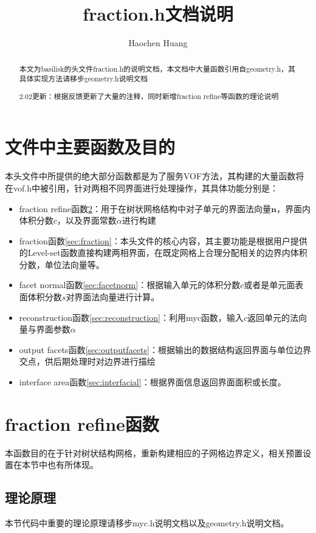 \documentclass[lang=cn,11pt,a4paper]{elegantpaper}
\title{fraction.h文档说明}
\author{Haochen Huang}
\institute{西安交通大学MFM课题组}
\date{\zhtoday}
\begin{document}
\maketitle
\tableofcontents

\begin{abstract}
本文为basilisk的头文件fraction.h的说明文档，本文档中大量函数引用自geometry.h，其具体实现方法请移步geometry.h说明文档\par
2.02更新：根据反馈更新了大量的注释，同时新增fraction refine等函数的理论说明
\end{abstract}


\section{文件中主要函数及目的}
本头文件中所提供的绝大部分函数都是为了服务VOF方法，其构建的大量函数将在vof.h中被引用，针对两相不同界面进行处理操作，其具体功能分别是：
\begin{itemize}
    \item fraction refine函数\ref{sec:fracrefine}：用于在树状网格结构中对子单元的界面法向量$\mathbf{n}$，界面内体积分数$c$，以及界面常数$\alpha$进行构建
    \item fraction函数\ref{sec:fraction}：本头文件的核心内容，其主要功能是根据用户提供的Level-set函数直接构建两相界面，在既定网格上合理分配相关的边界内体积分数，单位法向量等。
    \item facet normal函数\ref{sec:facetnorm}：根据输入单元的体积分数$c$或者是单元面表面体积分数$s$对界面法向量进行计算。
    \item reconstruction函数\ref{sec:reconstruction}：利用myc函数，输入$c$返回单元的法向量与界面参数$\alpha$
    \item output facets函数\ref{sec:outputfacets}：根据输出的数据结构返回界面与单位边界交点，供后期处理时对边界进行描绘
    \item interface area函数\ref{sec:interfacial}：根据界面信息返回界面面积或长度。
\end{itemize}
\section{fraction refine函数}\label{sec:fracrefine}
本函数目的在于针对树状结构网格，重新构建相应的子网格边界定义，相关预置设置在本节中也有所体现。
\subsection{理论原理}
本节代码中重要的理论原理请移步myc.h说明文档以及geometry.h说明文档。
\end{document}
